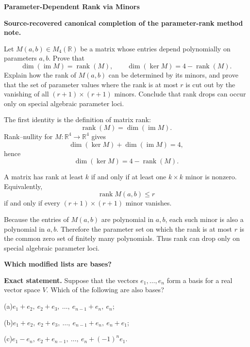 \begin{problem}[CP-I-0036]
\label{prob:cp-i-0036}
\textbf{Parameter-Dependent Rank via Minors}

\textbf{Source-recovered canonical completion of the parameter-rank method note.}

\hspace*{1.5em}Let \(M(a,b)\in M_4(\mathbb R)\) be a matrix whose entries depend polynomially
on parameters \(a,b\). Prove that
\[
\dim(\operatorname{im}M)=\operatorname{rank}(M),
\qquad
\dim(\ker M)=4-\operatorname{rank}(M).
\]
Explain how the rank of \(M(a,b)\) can be determined by its minors, and prove that the set of
parameter values where the rank is at most \(r\) is cut out by the vanishing of all
\((r+1)\times(r+1)\) minors. Conclude that rank drops can occur only on special algebraic
parameter loci.
\end{problem}

\begin{solution}
The first identity is the definition of matrix rank:
\[
\operatorname{rank}(M)=\dim(\operatorname{im}M).
\]
Rank--nullity for \(M:\mathbb R^4\to\mathbb R^4\) gives
\[
\dim(\ker M)+\dim(\operatorname{im}M)=4,
\]
hence
\[
\dim(\ker M)=4-\operatorname{rank}(M).
\]

A matrix has rank at least \(k\) if and only if at least one \(k\times k\) minor is nonzero.
Equivalently,
\[
\operatorname{rank}M(a,b)\le r
\]
if and only if every \((r+1)\times(r+1)\) minor vanishes.

Because the entries of \(M(a,b)\) are polynomial in \(a,b\), each such minor is also a polynomial
in \(a,b\). Therefore the parameter set on which the rank is at most \(r\) is the common zero
set of finitely many polynomials. Thus rank can drop only on special algebraic parameter loci.
\end{solution}

\begin{problem}[CP-I-0048]
\label{prob:cp-i-0048}
\textbf{Which modified lists are bases?}

\textbf{Exact statement.}
\hspace*{1.5em}Suppose that the vectors $e_1,\dots,e_n$ form a basis for a real vector space $V$.
Which of the following are also bases?

	\par\noindent (a)\quad $e_1+e_2,\ e_2+e_3,\ \dots,\ e_{n-1}+e_n,\ e_n$;
	\par\noindent (b)\quad $e_1+e_2,\ e_2+e_3,\ \dots,\ e_{n-1}+e_n,\ e_n+e_1$;
	\par\noindent (c)\quad $e_1-e_n,\ e_2+e_{n-1},\ \dots,\ e_n+(-1)^n e_1$.
\end{problem}


